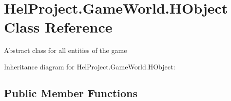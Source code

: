 \hypertarget{class_hel_project_1_1_game_world_1_1_h_object}{}\section{Hel\+Project.\+Game\+World.\+H\+Object Class Reference}
\label{class_hel_project_1_1_game_world_1_1_h_object}


Abstract class for all entities of the game  




Inheritance diagram for Hel\+Project.\+Game\+World.\+H\+Object\+:
\subsection*{Public Member Functions}
